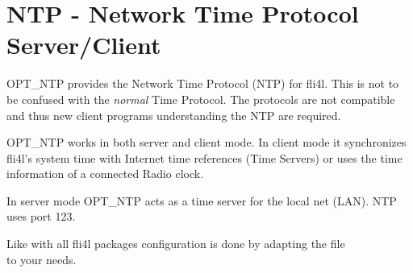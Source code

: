 {
\section {NTP - Network Time Protocol Server/Client}
}

OPT\_NTP provides the Network Time Protocol (NTP) for fli4l.
This is not to be confused with the \emph{normal} Time Protocol.
The protocols are not compatible and thus new client programs
understanding the NTP are required.

OPT\_NTP works in both server and client mode. In client mode it
synchronizes fli4l's system time with Internet time references (Time
Servers) or uses the time information of a connected Radio clock.

In server mode OPT\_NTP acts as a time server for the local
net (LAN). NTP uses port 123.


Like with all fli4l packages configuration is done by adapting the file\\
 to your needs.

